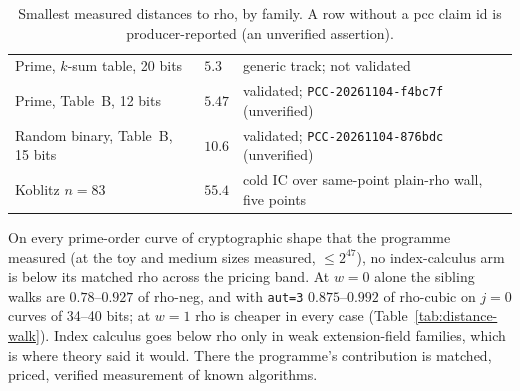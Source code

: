 \begin{table}[h]
\begin{tabularx}{\linewidth}{@{}>{\raggedright}p{3.9cm}l>{\raggedright\arraybackslash}X@{}}
Prime, $k$-sum table, 20 bits & $5.3$ & generic track; not validated \\
Prime, Table~B, 12 bits & $5.47$ & validated; \texttt{PCC-20261104-f4bc7f} (unverified) \\
Random binary, Table~B, 15 bits & $10.6$ & validated; \texttt{PCC-20261104-876bdc} (unverified) \\
Koblitz $n=83$ & $55.4$ & cold IC over same-point plain-rho wall, five points \\
\bottomrule
\end{tabularx}
\caption[]{Smallest measured distances to rho, by family. A row without
a pcc claim id is producer-reported (an unverified assertion).}
\label{tab:nearest}
\end{table}

On every prime-order curve of cryptographic shape that the programme
measured (at the toy and medium sizes measured, $\le2^{47}$), no
index-calculus arm is below its matched rho across the pricing band. At
$w=0$ alone the sibling walks are $0.78$--$0.927$ of rho-neg, and with
\texttt{aut=3} $0.875$--$0.992$ of rho-cubic on $j=0$ curves of 34--40
bits; at $w=1$ rho is cheaper in every case (Table~\ref{tab:distance-walk}). Index calculus goes below rho only in weak
extension-field families, which is where theory said it would. There the
programme's contribution is matched, priced, verified measurement of
known algorithms.
